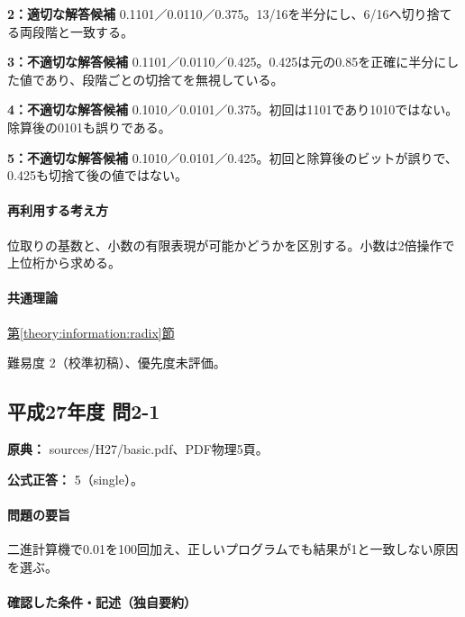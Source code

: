 \noindent\textbf{2：適切な解答候補} 0.1101／0.0110／0.375。13/16を半分にし、6/16へ切り捨てる両段階と一致する。\par

\noindent\textbf{3：不適切な解答候補} 0.1101／0.0110／0.425。0.425は元の0.85を正確に半分にした値であり、段階ごとの切捨てを無視している。\par

\noindent\textbf{4：不適切な解答候補} 0.1010／0.0101／0.375。初回は1101であり1010ではない。除算後の0101も誤りである。\par

\noindent\textbf{5：不適切な解答候補} 0.1010／0.0101／0.425。初回と除算後のビットが誤りで、0.425も切捨て後の値ではない。\par

\paragraph{再利用する考え方} 位取りの基数と、小数の有限表現が可能かどうかを区別する。小数は2倍操作で上位桁から求める。

\paragraph{共通理論} \hyperref[theory:information:radix]{第\ref*{theory:information:radix}節}

\par 難易度 2（校準初稿）、優先度未評価。

\subsection{平成27年度 問2-1}
\label{q:h27-reg-basic-2-1}

\noindent\textbf{原典：} sources/H27/basic.pdf、PDF物理5頁。

\textbf{公式正答：} 5（single）。

\paragraph{問題の要旨} 二進計算機で0.01を100回加え、正しいプログラムでも結果が1と一致しない原因を選ぶ。

\paragraph{確認した条件・記述（独自要約）}\mbox{}\par

